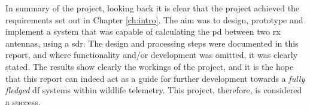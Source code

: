 \documentclass[class=report,11pt,crop=false]{standalone}
\begin{document}
In summary of the project, looking back it is clear that the project achieved the requirements set out in Chapter \ref{ch:intro}. The aim was to design, prototype and implement a system that was capable of calculating the \gls{pd} between two \gls{rx} antennas, using a \gls{sdr}. The design and processing steps were documented in this report, and where functionality and/or development was omitted, it was clearly stated. The results show clearly the workings of the project, and it is the hope that this report can indeed act as a guide for further development towards a \emph{fully fledged} \gls{df} systems within wildlife telemetry. This project, therefore, is considered a success.


\ifstandalone

\printnoidxglossary[type=\acronymtype,nonumberlist]
\fi
\end{document}
